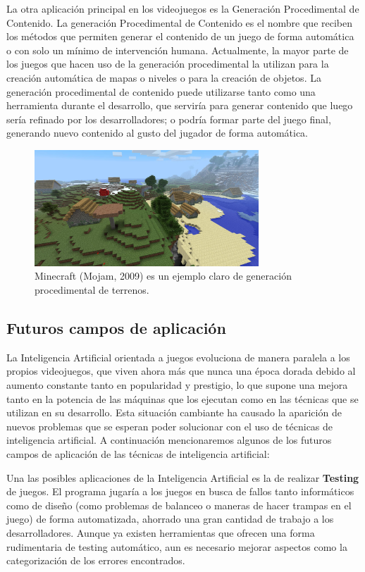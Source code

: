 La otra aplicación principal en los videojuegos es la Generación Procedimental de Contenido. La generación Procedimental de Contenido es el nombre que reciben los métodos que permiten generar el contenido de un juego de forma automática o con solo un mínimo de intervención humana. Actualmente, la mayor parte de los juegos que hacen uso de la generación procedimental la utilizan para la creación automática de mapas o niveles o para la creación de objetos. La generación procedimental de contenido puede utilizarse tanto como una herramienta durante el desarrollo, que serviría para generar contenido que luego sería refinado por los desarrolladores; o podría formar parte del juego final, generando nuevo contenido al gusto del jugador de forma automática.

\begin{figure}[h]
	\includegraphics[width=0.75\textwidth]{images/estadodelarte/ai/minecraft}
	\centering
	\caption{Minecraft (Mojam, 2009) es un ejemplo claro de generación procedimental de terrenos.}
\end{figure}


\subsection{Futuros campos de aplicación}
La Inteligencia Artificial orientada a juegos evoluciona de manera paralela a los propios videojuegos, que viven ahora más que nunca una época dorada debido al aumento constante tanto en popularidad y prestigio, lo que supone una mejora tanto en la potencia de las máquinas que los ejecutan como en las técnicas que se utilizan en su desarrollo. Esta situación cambiante ha causado la aparición de nuevos problemas que se esperan poder solucionar con el uso de técnicas de inteligencia artificial.\cite{ai_and_games} A continuación mencionaremos algunos de los futuros campos de aplicación de las técnicas de inteligencia artificial:

Una las posibles aplicaciones de la Inteligencia Artificial es la de realizar \textbf{Testing} de juegos. El programa jugaría a los juegos en busca de fallos tanto informáticos como de diseño (como problemas de balanceo o maneras de hacer trampas en el juego) de forma automatizada, ahorrado una gran cantidad de trabajo a los desarrolladores. Aunque ya existen herramientas que ofrecen una forma rudimentaria de testing automático, aun es necesario mejorar aspectos como la categorización de los errores encontrados.

